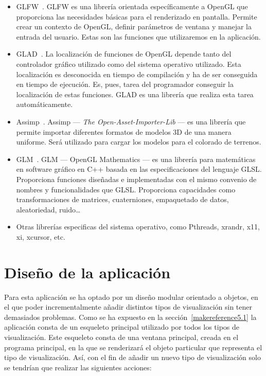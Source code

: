 \begin{itemize}
		\item GLFW~\cite{GLFW}. GLFW es una librería orientada específicamente a
				OpenGL que proporciona las necesidades básicas para el
				renderizado en pantalla. Permite crear un contexto de OpenGL,
				definir parámetros de ventana y manejar la entrada del usuario.
				Estas son las funciones que utilizaremos en la aplicación.
		\item GLAD~\cite{GLAD}. La localización de funciones de OpenGL depende
				tanto del controlador gráfico utilizado como del sistema
				operativo utilizado. Esta localización es desconocida en tiempo
				de  compilación y ha de ser conseguida en tiempo de ejecución.
				Es, pues, tarea del programador conseguir la localización de
				estas funciones. GLAD es una  librería que realiza esta tarea
				automáticamente.
		\item Assimp~\cite{ASSIMP}. Assimp --- \textit{The
				Open-Asset-Importer-Lib} --- es una librería que permite
				importar diferentes formatos de modelos 3D de una manera
				uniforme. Será utilizado para cargar los modelos para el
				colorado de terrenos.
		\item GLM~\cite{GLM}. GLM --- OpenGL Mathematics --- es una librería
				para matemáticas en software gráfico en C++ basada en las
				especificaciones del lenguaje GLSL. Proporciona funciones
				diseñadas e implementadas con el mismo convenio de nombres y
				funcionalidades que GLSL. Proporciona capacidades como
				transformaciones de matrices, cuaterniones, empaquetado de
				datos, aleatoriedad, ruido\ldots
		\item Otras librerías especificas del sistema operativo, como Pthreads,
				xrandr, x11, xi, xcursor, etc.
\end{itemize}

\section{Diseño de la aplicación}
\label{makereference5.3}

Para esta aplicación se ha optado por un diseño modular orientado a objetos, en
el que poder incrementalmente añadir distintos tipos de visualización sin tener
demasiados problemas. Como se ha expuesto en la sección~\ref{makereference5.1}
la aplicación consta de un esqueleto principal utilizado por todos los tipos de
visualización. Este esqueleto consta de una ventana principal, creada en el
programa principal, en la que se renderizará el objeto particular que representa
el tipo de visualización. Así, con el fin de añadir un nuevo tipo de
visualización solo se tendrían que realizar las siguientes acciones:

